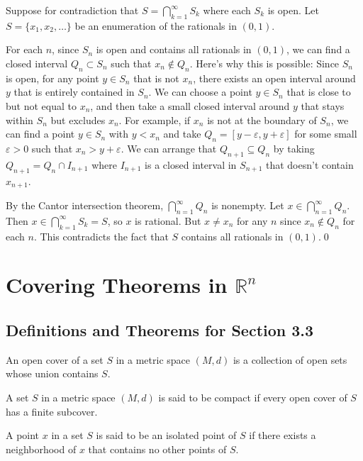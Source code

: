 Suppose for contradiction that $S = \bigcap_{k=1}^{\infty} S_k$ where each $S_k$ is open. Let $S = \{x_1, x_2, \ldots\}$ be an enumeration of the rationals in $(0,1)$.

For each $n$, since $S_n$ is open and contains all rationals in $(0,1)$, we can find a closed interval $Q_n \subset S_n$ such that $x_n \notin Q_n$. Here's why this is possible: Since $S_n$ is open, for any point $y \in S_n$ that is not $x_n$, there exists an open interval around $y$ that is entirely contained in $S_n$. We can choose a point $y \in S_n$ that is close to but not equal to $x_n$, and then take a small closed interval around $y$ that stays within $S_n$ but excludes $x_n$. For example, if $x_n$ is not at the boundary of $S_n$, we can find a point $y \in S_n$ with $y < x_n$ and take $Q_n = [y - \varepsilon, y + \varepsilon]$ for some small $\varepsilon > 0$ such that $x_n > y + \varepsilon$. We can arrange that $Q_{n+1} \subseteq Q_n$ by taking $Q_{n+1} = Q_n \cap I_{n+1}$ where $I_{n+1}$ is a closed interval in $S_{n+1}$ that doesn't contain $x_{n+1}$.

By the Cantor intersection theorem, $\bigcap_{n=1}^{\infty} Q_n$ is nonempty. Let $x \in \bigcap_{n=1}^{\infty} Q_n$. Then $x \in \bigcap_{k=1}^{\infty} S_k = S$, so $x$ is rational. But $x \neq x_n$ for any $n$ since $x_n \notin Q_n$ for each $n$. This contradicts the fact that $S$ contains all rationals in $(0,1)$.\qed
\section{Covering Theorems in $\mathbb{R}^n$}

\subsection*{Definitions and Theorems for Section 3.3}

\begin{definition}
An open cover of a set $S$ in a metric space $(M,d)$ is a collection of open sets whose union contains $S$.
\end{definition}

\begin{definition}
A set $S$ in a metric space $(M,d)$ is said to be compact if every open cover of $S$ has a finite subcover.
\end{definition}

\begin{definition}
A point $x$ in a set $S$ is said to be an isolated point of $S$ if there exists a neighborhood of $x$ that contains no other points of $S$.
\end{definition}

